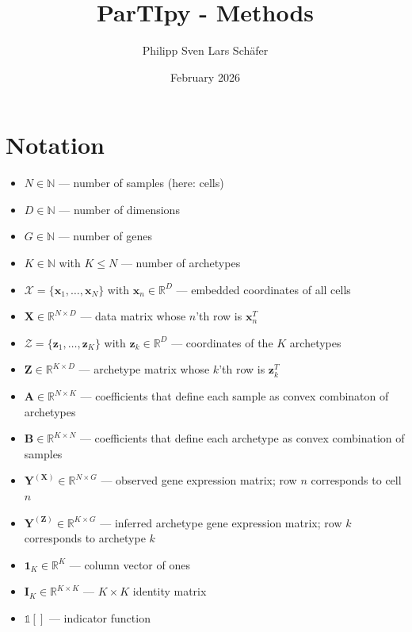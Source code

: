 \documentclass[oneside]{article}
\title{ParTIpy - Methods}
\author{Philipp Sven Lars Schäfer}
\date{February 2026}
\begin{document}
\maketitle

\tableofcontents
\clearpage

\section{Notation}\label{sec:notation}

\begin{itemize}
    \item $N \in \mathbb{N}$ — number of samples (here: cells)
    \item $D \in \mathbb{N}$ — number of dimensions
    \item $G \in \mathbb{N}$ — number of genes
    \item $K \in \mathbb{N}$ with $K \leq N$ — number of archetypes

    \item $\mathcal{X} = \{\mathbf{x}_1, \ldots, \mathbf{x}_N\}$ with $\mathbf{x}_n \in \mathbb{R}^D$ — embedded coordinates of all cells
    \item $\mathbf{X} \in \mathbb{R}^{N \times D}$ — data matrix whose $n$'th row is $\mathbf{x}_n^T$

    \item $\mathcal{Z} = \{\mathbf{z}_1, \ldots, \mathbf{z}_K\}$ with $\mathbf{z}_k \in \mathbb{R}^D$ — coordinates of the $K$ archetypes
    \item $\mathbf{Z} \in \mathbb{R}^{K \times D}$ — archetype matrix whose $k$'th row is $\mathbf{z}_k^T$

    \item $\mathbf{A} \in \mathbb{R}^{N \times K}$ — coefficients that define each sample as convex combinaton of archetypes
    \item $\mathbf{B} \in \mathbb{R}^{K \times N}$ — coefficients that define each archetype as convex combination of samples

    \item $\mathbf{Y}^{(\mathbf{X})} \in \mathbb{R}^{N \times G}$ — observed gene expression matrix; row $n$ corresponds to cell $n$
    \item $\mathbf{Y}^{(\mathbf{Z})} \in \mathbb{R}^{K \times G}$ — inferred archetype gene expression matrix; row $k$ corresponds to archetype $k$

    \item $\mathbf{1}_K \in \mathbb{R}^K$ — column vector of ones
    \item $\mathbf{I}_K \in \mathbb{R}^{K \times K}$ — $K \times K$ identity matrix
    \item $\mathds{1}[]$ — indicator function
\end{itemize}
\end{document}
